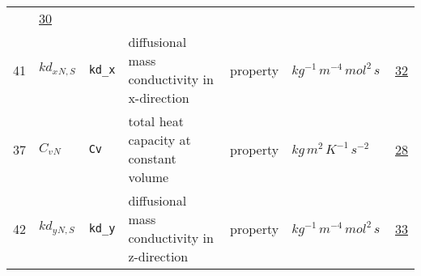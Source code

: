 \begin{longtable}{|p{1cm}|p{2.5cm}|p{4.5cm}|p{8cm}|p{3.0cm}|p{3cm}|p{1cm}|}
             &                 \hyperlink{"e:30"}{ 30 }
                 \\
            41
             & \hypertarget{"v:41"}{ $ {kd_x}{_{N, S}} $}
             & \verb|kd_x|
             & diffusional mass conductivity in x-direction
             & \begin{lay}property \end{lay}
             & $ kg^{-1} \,m^{-4} \,mol^{2} \,s \, $
             &                 \hyperlink{"e:32"}{ 32 }
                 \\
            37
             & \hypertarget{"v:37"}{ $ {{C_v}}{_{N}} $}
             & \verb|Cv|
             & total heat capacity at constant volume
             & \begin{lay}property \end{lay}
             & $ kg \,m^{2} \,K^{-1} \,s^{-2} \, $
             &                 \hyperlink{"e:28"}{ 28 }
                 \\
            42
             & \hypertarget{"v:42"}{ $ {kd_y}{_{N, S}} $}
             & \verb|kd_y|
             & diffusional mass conductivity in z-direction
             & \begin{lay}property \end{lay}
             & $ kg^{-1} \,m^{-4} \,mol^{2} \,s \, $
             &                 \hyperlink{"e:33"}{ 33 }
                 \\
    \end{longtable}
